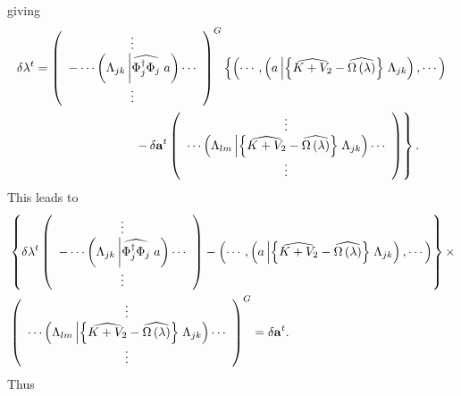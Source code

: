 \documentclass[aps,preprint]{revtex4}%
\begin{document}
giving
\begin{align}
\delta\mathbf{\lambda}^{t}  &  =\left(
\begin{array}
[c]{c}%
\vdots\\
-\cdots\left(  \Lambda_{jk}\left\vert \widehat{\Phi_{j}^{\dagger}\Phi_{j}%
}\right.  a\right)  \cdots\\
\vdots
\end{array}
\right)  ^{G}\left\{  \left(  \cdots,\left(  a\left\vert \left\{
\widehat{K+V_{2}}-\widehat{\Omega\left(  \lambda\right)  }\right\}  \right.
\Lambda_{jk}\right)  ,\cdots\right)  \right. \nonumber\\
&  \qquad\qquad\qquad\qquad\left.  -\,\delta\mathbf{a}^{t}\left(
\begin{array}
[c]{c}%
\vdots\\
\cdots\left(  \Lambda_{lm}\left\vert \left\{  \widehat{K+V_{2}}-\widehat
{\Omega\left(  \lambda\right)  }\right\}  \right.  \Lambda_{jk}\right)
\cdots\\
\vdots
\end{array}
\right)  \right\}  .
\end{align}
This leads to
\begin{align}
&  \left\{  \delta\mathbf{\lambda}^{t}\left(
\begin{array}
[c]{c}%
\vdots\\
-\cdots\left(  \Lambda_{jk}\left\vert \widehat{\Phi_{j}^{\dagger}\Phi_{j}%
}\right.  a\right)  \cdots\\
\vdots
\end{array}
\right)  -\left(  \cdots,\left(  a\left\vert \left\{  \widehat{K+V_{2}%
}-\widehat{\Omega\left(  \lambda\right)  }\right\}  \right.  \Lambda
_{jk}\right)  ,\cdots\right)  \right\}  \times\nonumber\\
&  \left(
\begin{array}
[c]{c}%
\vdots\\
\cdots\left(  \Lambda_{lm}\left\vert \left\{  \widehat{K+V_{2}}-\widehat
{\Omega\left(  \lambda\right)  }\right\}  \right.  \Lambda_{jk}\right)
\cdots\\
\vdots
\end{array}
\right)  ^{G}=\delta\mathbf{a}^{t}.
\end{align}
Thus
\end{document}
